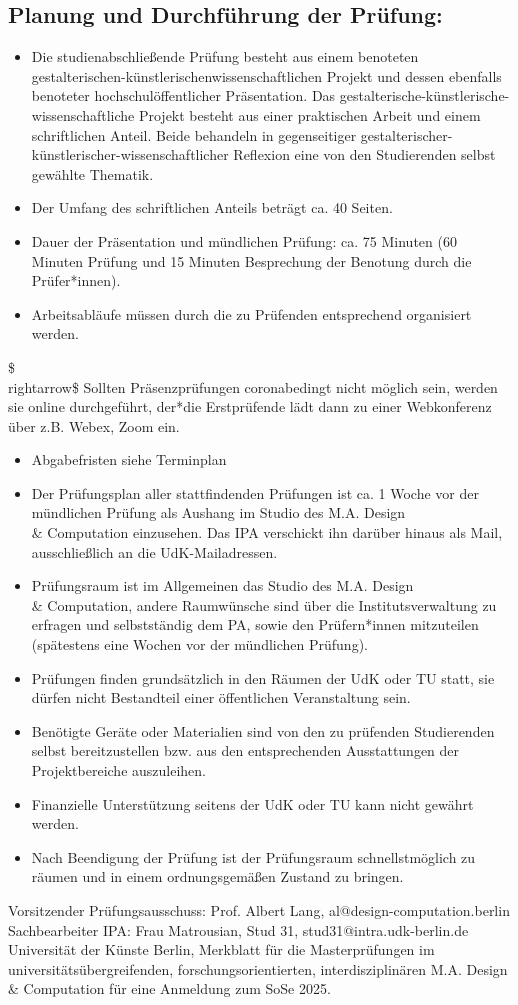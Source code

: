\documentclass{article}%
\begin{document}
\subsection*{Planung und Durchführung der Prüfung:}
%
\begin{itemize}
\item Die studienabschließende Prüfung besteht aus einem benoteten gestalterischen-künstlerischenwissenschaftlichen Projekt und dessen ebenfalls benoteter hochschulöffentlicher Präsentation. Das gestalterische-künstlerische-wissenschaftliche Projekt besteht aus einer praktischen Arbeit und einem schriftlichen Anteil. Beide behandeln in gegenseitiger gestalterischer-künstlerischer-wissenschaftlicher Reflexion eine von den Studierenden selbst gewählte Thematik.
\item Der Umfang des schriftlichen Anteils beträgt ca. 40 Seiten.
\item Dauer der Präsentation und mündlichen Prüfung: ca. 75 Minuten (60 Minuten Prüfung und 15 Minuten Besprechung der Benotung durch die Prüfer*innen).
\item Arbeitsabläufe müssen durch die zu Prüfenden entsprechend organisiert werden.
\end{itemize}
\$\\rightarrow\$ Sollten Präsenzprüfungen coronabedingt nicht möglich sein, werden sie online durchgeführt, der*die Erstprüfende lädt dann zu einer Webkonferenz über z.B. Webex, Zoom ein.
\begin{itemize}
\item Abgabefristen siehe Terminplan
\item Der Prüfungsplan aller stattfindenden Prüfungen ist ca. 1 Woche vor der mündlichen Prüfung als Aushang im Studio des M.A. Design \\\& Computation einzusehen. Das IPA verschickt ihn darüber hinaus als Mail, ausschließlich an die UdK-Mailadressen.
\item Prüfungsraum ist im Allgemeinen das Studio des M.A. Design \\\& Computation, andere Raumwünsche sind über die Institutsverwaltung zu erfragen und selbstständig dem PA, sowie den Prüfern*innen mitzuteilen (spätestens eine Wochen vor der mündlichen Prüfung).
\item Prüfungen finden grundsätzlich in den Räumen der UdK oder TU statt, sie dürfen nicht Bestandteil einer öffentlichen Veranstaltung sein.
\item Benötigte Geräte oder Materialien sind von den zu prüfenden Studierenden selbst bereitzustellen bzw. aus den entsprechenden Ausstattungen der Projektbereiche auszuleihen.
\item Finanzielle Unterstützung seitens der UdK oder TU kann nicht gewährt werden.
\item Nach Beendigung der Prüfung ist der Prüfungsraum schnellstmöglich zu räumen und in einem ordnungsgemäßen Zustand zu bringen.
\end{itemize}
%
Vorsitzender Prüfungsausschuss: Prof. Albert Lang, al@design-computation.berlin
Sachbearbeiter IPA: Frau Matrousian, Stud 31, stud31@intra.udk-berlin.de
Universität der Künste Berlin, Merkblatt für die Masterprüfungen im universitätsübergreifenden, forschungsorientierten, interdisziplinären M.A. Design \& Computation
für eine Anmeldung zum SoSe 2025. 
%
\end{document}
